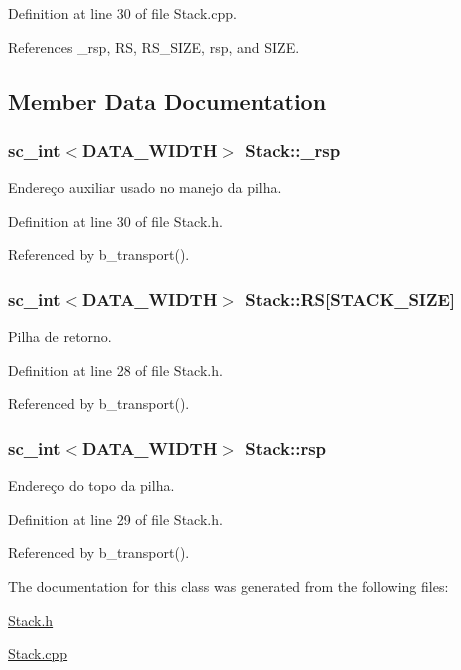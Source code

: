 Definition at line 30 of file Stack.\+cpp.



References \+\_\+rsp, R\+S, R\+S\+\_\+\+S\+I\+Z\+E, rsp, and S\+I\+Z\+E.



\subsection{Member Data Documentation}
\hypertarget{classStack_ad8eeb266003348c5d2611d8078e172e5}{
\subsubsection[{\+\_\+rsp}]{\setlength{\rightskip}{0pt plus 5cm}sc\+\_\+int$<${\bf D\+A\+T\+A\+\_\+\+W\+I\+D\+T\+H}$>$ Stack\+::\+\_\+rsp\hspace{0.3cm}{\ttfamily [private]}}}\label{classStack_ad8eeb266003348c5d2611d8078e172e5}
Endereço auxiliar usado no manejo da pilha. 

Definition at line 30 of file Stack.\+h.



Referenced by b\+\_\+transport().

\hypertarget{classStack_afaf63d71e48a971dd6556df7bfd49674}{
\subsubsection[{R\+S}]{\setlength{\rightskip}{0pt plus 5cm}sc\+\_\+int$<${\bf D\+A\+T\+A\+\_\+\+W\+I\+D\+T\+H}$>$ Stack\+::\+R\+S\mbox{[}{\bf S\+T\+A\+C\+K\+\_\+\+S\+I\+Z\+E}\mbox{]}\hspace{0.3cm}{\ttfamily [private]}}}\label{classStack_afaf63d71e48a971dd6556df7bfd49674}
Pilha de retorno. 

Definition at line 28 of file Stack.\+h.



Referenced by b\+\_\+transport().

\hypertarget{classStack_a1bea5600d11871fa8b06e213537a418e}{
\subsubsection[{rsp}]{\setlength{\rightskip}{0pt plus 5cm}sc\+\_\+int$<${\bf D\+A\+T\+A\+\_\+\+W\+I\+D\+T\+H}$>$ Stack\+::rsp\hspace{0.3cm}{\ttfamily [private]}}}\label{classStack_a1bea5600d11871fa8b06e213537a418e}
Endereço do topo da pilha. 

Definition at line 29 of file Stack.\+h.



Referenced by b\+\_\+transport().



The documentation for this class was generated from the following files\+:\begin{DoxyCompactItemize}
\item 
\hyperlink{Stack_8h}{Stack.\+h}\item 
\hyperlink{Stack_8cpp}{Stack.\+cpp}\end{DoxyCompactItemize}
